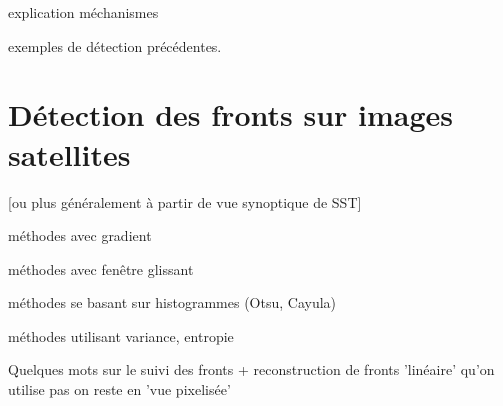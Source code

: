 explication méchanismes

exemples de détection précédentes.


\section{Détection des fronts sur images satellites}
[ou plus généralement à partir de vue synoptique de SST]

méthodes avec gradient

méthodes avec fenêtre glissant

méthodes se basant sur histogrammes (Otsu, Cayula)

méthodes utilisant variance, entropie

Quelques mots sur le suivi des fronts + reconstruction de fronts 'linéaire'
qu'on utilise pas on reste en 'vue pixelisée'
